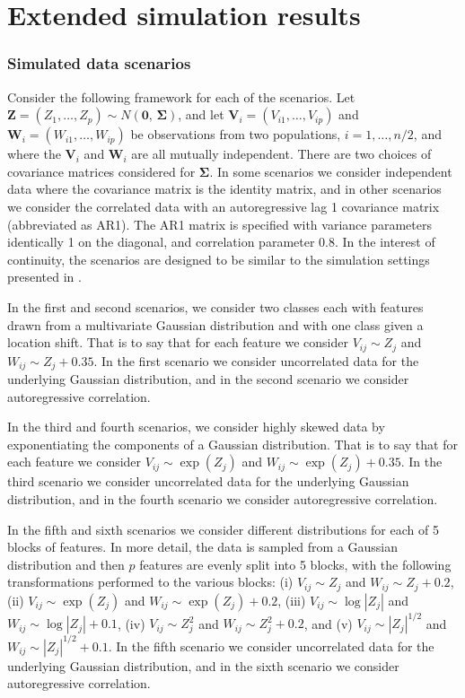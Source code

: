 \documentclass{article}
\renewcommand{\vec}{\bm}
\begin{document}
\section{Extended simulation results}
\label{sec:simulation-results}

\subsubsection{Simulated data scenarios}
\label{sec:simulated-data-scenarios}

Consider the following framework for each of the scenarios.  Let
$\vec{Z} = (Z_1, \dots, Z_p) \sim N(\vec{0},\, \vec{\Sigma})$, and let
$\vec{V}_i = (V_{i1}, \dots, V_{ip})$ and $\vec{W}_i = (W_{i1}, \dots, W_{ip})$
be observations from two populations, $i = 1, \dots, n / 2$, and where the
$\vec{V}_i$ and $\vec{W}_i$ are all mutually independent.  There are two choices
of covariance matrices considered for $\vec{\Sigma}$.  In some scenarios we
consider independent data where the covariance matrix is the identity matrix,
and in other scenarios we consider the correlated data with an autoregressive
lag 1 covariance matrix (abbreviated as AR1).  The AR1 matrix is specified with
variance parameters identically 1 on the diagonal, and correlation parameter
0.8.  In the interest of continuity, the scenarios are designed to be similar to
the simulation settings presented in \cite{hennig2016}.

In the first and second scenarios, we consider two classes each with features
drawn from a multivariate Gaussian distribution and with one class given a
location shift.  That is to say that for each feature we consider
$V_{ij} \sim Z_j$ and $W_{ij} \sim Z_j + 0.35$.  In the first scenario we
consider uncorrelated data for the underlying Gaussian distribution, and in the
second scenario we consider autoregressive correlation.

In the third and fourth scenarios, we consider highly skewed data by
exponentiating the components of a Gaussian distribution.  That is to say that
for each feature we consider $V_{ij} \sim \exp(Z_j)$ and
$W_{ij} \sim \exp(Z_j) + 0.35$.  In the third scenario we consider uncorrelated
data for the underlying Gaussian distribution, and in the fourth scenario we
consider autoregressive correlation.

In the fifth and sixth scenarios we consider different distributions for each of
5 blocks of features.  In more detail, the data is sampled from a Gaussian
distribution and then $p$ features are evenly split into 5 blocks, with the
following transformations performed to the various blocks: (i) $V_{ij} \sim Z_j$
and $W_{ij} \sim Z_j + 0.2$, (ii) $V_{ij} \sim \exp(Z_j)$ and
$W_{ij} \sim \exp(Z_j) + 0.2$, (iii) $V_{ij} \sim \log |Z_j|$ and
$W_{ij} \sim \log |Z_j| + 0.1$, (iv) $V_{ij} \sim Z_j^2$ and
$W_{ij} \sim Z_j^2 + 0.2$, and (v) $V_{ij} \sim |Z_j|^{1/2}$ and
$W_{ij} \sim |Z_j|^{1/2} + 0.1$.  In the fifth scenario we consider uncorrelated
data for the underlying Gaussian distribution, and in the sixth scenario we
consider autoregressive correlation.
\end{document}
